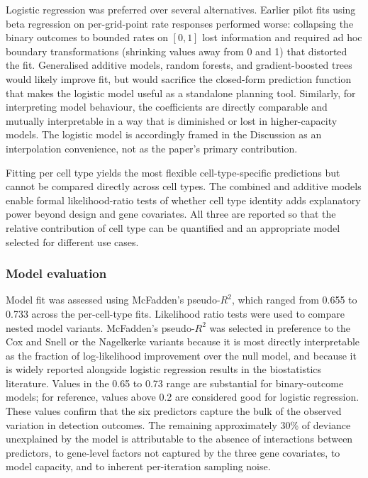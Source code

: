\documentclass[
]{article}
\begin{document}
Logistic regression was preferred over several alternatives. Earlier
pilot fits using beta regression on per-grid-point rate responses
performed worse: collapsing the binary outcomes to bounded rates on
\([0,1]\) lost information and required ad hoc boundary transformations
(shrinking values away from 0 and 1) that distorted the fit. Generalised
additive models, random forests, and gradient-boosted trees would likely
improve fit, but would sacrifice the closed-form prediction function
that makes the logistic model useful as a standalone planning tool.
Similarly, for interpreting model behaviour, the coefficients are
directly comparable and mutually interpretable in a way that is
diminished or lost in higher-capacity models. The logistic model is
accordingly framed in the Discussion as an interpolation convenience,
not as the paper's primary contribution.

Fitting per cell type yields the most flexible cell-type-specific
predictions but cannot be compared directly across cell types. The
combined and additive models enable formal likelihood-ratio tests of
whether cell type identity adds explanatory power beyond design and gene
covariates. All three are reported so that the relative contribution of
cell type can be quantified and an appropriate model selected for
different use cases.

\subsubsection{Model evaluation}\label{model-evaluation}

Model fit was assessed using McFadden's pseudo-\(R^2\), which ranged
from 0.655 to 0.733 across the per-cell-type fits. Likelihood ratio
tests were used to compare nested model variants. McFadden's
pseudo-\(R^2\) was selected in preference to the Cox and Snell or the
Nagelkerke variants because it is most directly interpretable as the
fraction of log-likelihood improvement over the null model, and because
it is widely reported alongside logistic regression results in the
biostatistics literature. Values in the 0.65 to 0.73 range are
substantial for binary-outcome models; for reference, values above 0.2
are considered good for logistic regression. These values confirm that
the six predictors capture the bulk of the observed variation in
detection outcomes. The remaining approximately 30\% of deviance
unexplained by the model is attributable to the absence of interactions
between predictors, to gene-level factors not captured by the three gene
covariates, to model capacity, and to inherent per-iteration sampling
noise.
\end{document}
